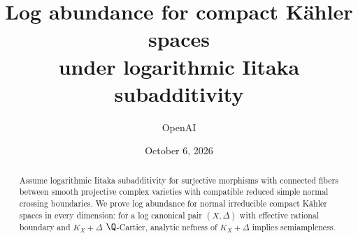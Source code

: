 \documentclass[11pt,letterpaper]{article}
\title{Log abundance for compact Kähler spaces\\
under logarithmic Iitaka subadditivity}
\author{OpenAI}
\date{October 6, 2026}
\begin{document}
\maketitle

\begin{abstract}
Assume logarithmic Iitaka subadditivity for surjective morphisms with
connected fibers between smooth projective complex varieties with compatible
reduced simple normal crossing boundaries. We prove log abundance for normal
irreducible compact Kähler spaces in every dimension: for a log canonical
pair \((X,\Delta)\) with effective rational boundary and \(K_X+\Delta\)
\(\Q\)-Cartier, analytic nefness of \(K_X+\Delta\) implies semiampleness.
\end{abstract}

\tableofcontents











\end{document}
